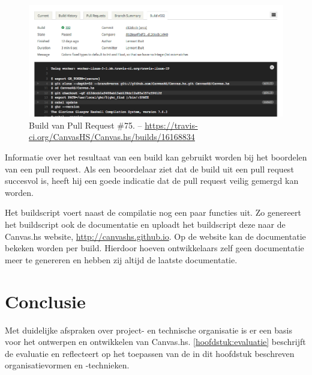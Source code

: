 \begin{figure}[H]
\begin{center}
\includegraphics[keepaspectratio,width=\textwidth]{./images/travis.png}
\caption{Build van Pull Request \#75. – \url{https://travis-ci.org/CanvasHS/Canvas.hs/builds/16168834}}
\label{fig:travis}
\end{center}
\end{figure}

Informatie over het resultaat van een build kan gebruikt worden bij het boordelen van een pull request. Als een beoordelaar ziet dat de build uit een pull request succesvol is, heeft hij een goede indicatie dat de pull request veilig gemergd kan worden.

Het buildscript voert naast de compilatie nog een paar functies uit. Zo genereert het buildscript ook de documentatie en uploadt het buildscript deze naar de Canvas.hs website, \url{http://canvashs.github.io}. Op de website kan de documentatie bekeken worden per build. Hierdoor hoeven ontwikkelaars zelf geen documentatie meer te genereren en hebben zij altijd de laatste documentatie.

\section{Conclusie}
Met duidelijke afspraken over project- en technische organisatie is er een basis voor het ontwerpen en ontwikkelen van Canvas.hs. \autoref{hoofdstuk:evaluatie} beschrijft de evaluatie en reflecteert op het toepassen van de in dit hoofdstuk beschreven organisatievormen en -technieken. 
